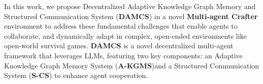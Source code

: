 






In this work, we propose Decentralized Adaptive Knowledge Graph Memory and Structured Communication System (\textbf{DAMCS}) in a novel \textbf{Multi-agent Crafter} environment to address these fundamental challenges that enable agents to collaborate, and dynamically adapt in complex, open-ended environments like open-world survival games.
\textbf{DAMCS} is a novel decentralized multi-agent framework that leverages LLMs, featuring two key components: an Adaptive Knowledge Graph Memory System (\textbf{A-KGMS})and a Structured Communication System (\textbf{S-CS}) to enhance agent cooperation. 



